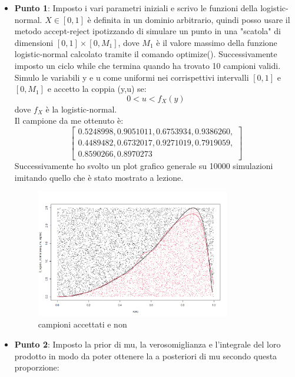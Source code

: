 \documentclass[a4paper,12pt]{article}
\begin{document}
\begin{itemize}
	\item \textbf{Punto 1}: Imposto i vari parametri iniziali e scrivo le funzioni della logistic-normal. $X \in [0,1]$ è definita in un dominio arbitrario, quindi posso usare il metodo accept-reject ipotizzando di simulare un punto in una "scatola" di dimensioni $[0, 1] \times [0, M_1]$, dove $M_1$ è il valore massimo della funzione logistic-normal calcolato tramite il comando optimize(). Successivamente imposto un ciclo while che termina quando ha trovato 10 campioni validi. Simulo le variabili y e u come uniformi nei corrispettivi intervalli $[0,1]$ e $[0,M_1]$ e accetto la coppia (y,u) se:\\
	\[
	0 < u < f_X(y)
	\]
	dove $f_X$ è la logistic-normal.\\
    Il campione da me ottenuto è:\\
	\[
	\left[
	\begin{array}{l}
		0.5248998, 0.9051011, 0.6753934, 0.9386260, \\
		0.4489482, 0.6732017, 0.9271019, 0.7919059, \\
		0.8590266, 0.8970273
	\end{array}
	\right]
	\]
	Successivamente ho svolto un plot grafico generale su 10000 simulazioni imitando quello che è stato mostrato a lezione.
	\begin{figure}[h] %
		\centering %
		\includegraphics[width=0.8\textwidth]{lognorm.png} %
		\caption{campioni accettati e non} %
		\label{fig:immagine} %
	\end{figure}
	\newpage
	\item \textbf{Punto 2}: Imposto la prior di mu, la verosomiglianza e l'integrale del loro prodotto in modo da poter ottenere la a posteriori di mu secondo questa proporzione:

\end{itemize}
\end{document}
